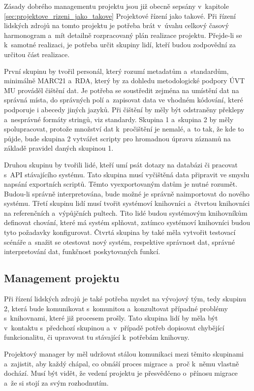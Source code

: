 \documentclass[
	11pt, oneside, printed, final, palatino, monochrome
	microtype,
	table,   %
	lof,     %
	lot     %
]{fithesis3}
\begin{document}
{Zásady dobrého managementu projektu jsou již obecně sepsány v~kapitole \ref{sec:projektove_rizeni_jako_takove} Projektové řízení jako takové. Při řízení lidských zdrojů na tomto projektu je potřeba brát v~úvahu celkový časový harmonogram a~mít detailně rozpracovaný plán realizace projektu. Přejde-li se k~samotné realizaci, je potřeba určit skupiny lidí, kteří budou zodpovědní za určitou část realizace.

První skupinu by tvořil personál, který rozumí metadatům a~standardům, minimálně MARC21 a~RDA, který by za dohledu metodologické podpory ÚVT MU prováděl čištění dat. Je potřeba se soustředit zejména na umístění dat na správná místa, do správných polí a~zapisovat data ve vhodném kódování, které podporuje i abecedy jiných jazyků. Při čištění by měly být odstraněny překlepy a~nesprávné formáty stringů, viz standardy. Skupina 1 a~skupina 2 by měly spolupracovat, protože množství dat k~pročištění je nemalé, a~to tak, že kde to půjde, bude skupina 2 vytvářet scripty pro hromadnou úpravu záznamů na základě pravidel daných skupinou 1.

Druhou skupinu by tvořili lidé, kteří umí psát dotazy na databázi či pracovat s~API stávajícího systému. Tato skupina musí vyčištěná data připravit ve smyslu napsání exportních scriptů. Těmto vyexportovaným datům je nutné  rozumět. Budou-li správně interpretována, bude možné je správně naimportovat do nového systému.
Třetí skupinu lidí musí tvořit systémoví knihovníci a~čtvrtou knihovníci na referenčních a~výpůjčních pultech. Tito lidé budou systémovým knihovníkům definovat chování, které má systém splňovat, zatímco systémoví knihovníci budou tyto požadavky konfigurovat. Čtvrtá skupina by také měla vytvořit testovací scénáře a~snažit se otestovat nový systém, respektive správnost dat, správné interpretování dat, funkčnost poskytovaných funkcí.

\subsection{Management projektu}
Při řízení lidských zdrojů je také potřeba myslet na vývojový tým, tedy skupinu 2, která bude komunikovat s~komunitou a~konzultovat případné problémy s~knihovnami, které již procesem prošly. Tato skupina lidí by měla být v~kontaktu s~předchozí skupinou a~v~případě potřeb dopisovat chybějící funkcionalitu, či upravovat tu stávající k~potřebám knihovny.

Projektový manager by měl udržovat stálou komunikaci mezi těmito skupinami a~zajistit, aby každý chápal, co obnáší proces migrace a~proč k~němu vlastně dochází. Musí být vidět, že vedení projektu je přesvědčeno o~přínosu migrace a~že si stojí za svým rozhodnutím. 

}
\end{document}
